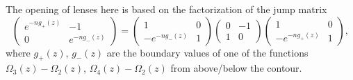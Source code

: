 \documentclass[usenames,dvipsnames]{article}
\theoremstyle{definition}
\numberwithin{equation}{section}
\numberwithin{figure}{section}
\begin{document}
The opening of lenses here is based on the factorization of the jump matrix
    \begin{equation}
        \begin{pmatrix}
            e^{-ng_+(z)} & -1 \\
            0 & e^{-n g_-(z)}
        \end{pmatrix}
        =
        \begin{pmatrix}
            1 & 0 \\
            -e^{-n g_-(z)} & 1
        \end{pmatrix}
        \begin{pmatrix}
            0 & -1 \\
            1 & 0
        \end{pmatrix}
        \begin{pmatrix}
            1 & 0 \\
            -e^{-n g_+(z)} & 1
        \end{pmatrix},
    \end{equation}
where $g_+(z)$, $g_-(z)$ are the boundary values of one of the functions $\Omega_3(z) -\Omega_2(z)$, $\Omega_4(z) - \Omega_2(z)$ from above/below the contour.
\end{document}
